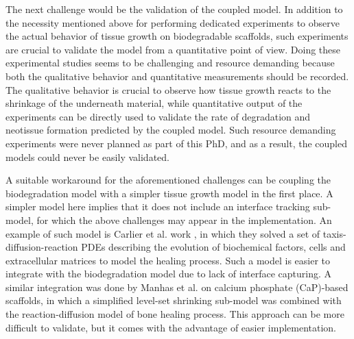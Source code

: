 The next challenge would be the validation of the coupled model. In addition to the necessity mentioned above for performing dedicated experiments to observe the actual behavior of tissue growth on biodegradable scaffolds, such experiments are crucial to validate the model from a quantitative point of view. Doing these experimental studies seems to be challenging and resource demanding because both the qualitative behavior and quantitative measurements should be recorded. The qualitative behavior is crucial to observe how tissue growth reacts to the shrinkage of the underneath material, while quantitative output of the experiments can be directly used to validate the rate of degradation and neotissue formation predicted by the coupled model. Such resource demanding experiments were never planned as part of this PhD, and as a result, the coupled models could never be easily validated.


A suitable workaround for the aforementioned challenges can be coupling the biodegradation model with a simpler tissue growth model in the first place. A simpler model here implies that it does not include an interface tracking sub-model, for which the above challenges may appear in the implementation. An example of such model is Carlier et al. work \cite{Carlier2012,Carlier2016}, in which they solved a set of taxis-diffusion-reaction PDEs describing the evolution of biochemical factors, cells and extracellular matrices to model the healing process. Such a model is easier to integrate with the biodegradation model due to lack of interface capturing. A similar integration was done by Manhas et al. \cite{Manhas2016} on calcium phosphate (CaP)-based scaffolds, in which a simplified level-set shrinking sub-model was combined with the reaction-diffusion model of bone healing process. This approach can be more difficult to validate, but it comes with the advantage of easier implementation.


%
%
%
%
%
%
%

\cleardoublepage

